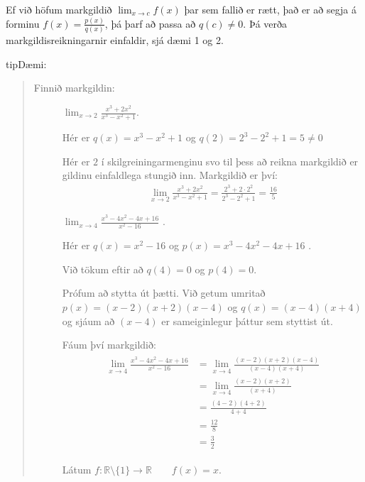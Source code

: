 \documentclass[a4paper,10pt,icelandic]{sphinxmanual}
\begin{document}
Ef við höfum markgildið \(\lim_{x \to c} f(x)\) þar sem fallið er rætt, það er að segja á forminu \(f(x) = \frac{p(x)}{q(x)}\), þá þarf að passa að \(q(c) \neq 0\). Þá verða markgildisreikningarnir einfaldir, sjá dæmi 1 og 2.

\begin{sphinxadmonition}{tip}{Dæmi:}\begin{quote}

Finnið markgildin:
\begin{description}
\item[{}] \leavevmode
\(\lim_{x\to 2}\frac{x^3+2x^2}{x^3-x^2+1}\).

Hér er \(q(x)=x^3-x^2+1\)
og \(q(2)=2^3-2^2+1=5\not=0\)

Hér er \(2\) í skilgreiningarmenginu svo til þess að reikna markgildið er gildinu einfaldlega stungið inn.
Markgildið er því:
\begin{equation*}
\begin{split}\lim_{x\to 2}\frac{x^3+2x^2}{x^3-x^2+1}=\frac{2^3+2\cdot 2^2}{2^3-2^2+1}=\frac{16}{5}\end{split}
\end{equation*}
\item[{}] \leavevmode
\(\lim_{x\to 4}\frac{x^3-4x^2-4x+16}{x^2-16}\) .

Hér er \(q(x)=x^2-16\) og \(p(x)=x^3-4x^2-4x+16\) .

Við tökum eftir að \(q(4)=0\) og \(p(4)=0\).

Prófum að stytta út þætti.
Við getum umritað \(p(x) = (x-2)(x+2)(x-4)\) og \(q(x)=(x-4)(x+4)\)
og sjáum að \((x-4)\) er sameiginlegur þáttur sem styttist út.

Fáum því markgildið:
\begin{equation*}
\begin{split}\begin{aligned}
 \lim_{x\to 4}\frac{x^3-4x^2-4x+16}{x^2-16} &= \lim_{x\to 4} \frac{(x-2)(x+2)(x-4)}{(x-4)(x+4)} \\
       &=\lim_{x\to 4}\frac{(x-2)(x+2)}{(x+4)}\\
 &=\frac{(4-2)(4+2)}{4+4}\\
 &=\frac{12}{8}\\
 &=\frac{3}{2}
\end{aligned}\end{split}
\end{equation*}
\item[{}] \leavevmode
Látum \(f: \mathbb{R} \setminus \{1\} \to \mathbb{R} \qquad f(x)=x\).


\end{description}
\end{quote}
\end{sphinxadmonition}
\end{document}
